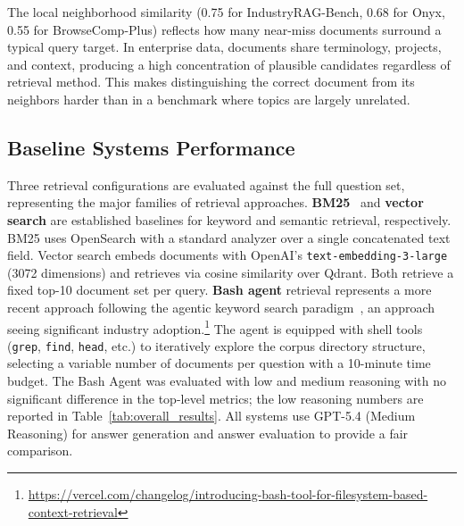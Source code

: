 \documentclass{article}
\begin{document}
The local neighborhood similarity (0.75 for IndustryRAG-Bench, 0.68 for Onyx, 0.55 for BrowseComp-Plus) reflects how many near-miss documents surround a typical query target. In enterprise data, documents share terminology, projects, and context, producing a high concentration of plausible candidates regardless of retrieval method. This makes distinguishing the correct document from its neighbors harder than in a benchmark where topics are largely unrelated.

\subsection{Baseline Systems Performance}
\label{sec:baselines}

Three retrieval configurations are evaluated against the full question set, representing the major families of retrieval approaches. \textbf{BM25}~\citep{robertson2009bm25} and \textbf{vector search} are established baselines for keyword and semantic retrieval, respectively. BM25 uses OpenSearch with a standard analyzer over a single concatenated text field. Vector search embeds documents with OpenAI's \texttt{text-embedding-3-large}~\citep{openai2024embeddings} (3072 dimensions) and retrieves via cosine similarity over Qdrant. Both retrieve a fixed top-10 document set per query. \textbf{Bash agent} retrieval represents a more recent approach following the agentic keyword search paradigm~\citep{subramanian2025keyword}, an approach seeing significant industry adoption.\footnote{\url{https://vercel.com/changelog/introducing-bash-tool-for-filesystem-based-context-retrieval}} The agent is equipped with shell tools (\texttt{grep}, \texttt{find}, \texttt{head}, etc.) to iteratively explore the corpus directory structure, selecting a variable number of documents per question with a 10-minute time budget. The Bash Agent was evaluated with low and medium reasoning with no significant difference in the top-level metrics; the low reasoning numbers are reported in Table~\ref{tab:overall_results}. All systems use GPT-5.4 (Medium Reasoning) for answer generation and answer evaluation to provide a fair comparison.
\end{document}
